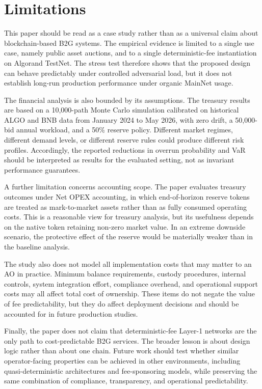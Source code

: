 \documentclass[runningheads]{llncs}
\begin{document}
\section{Limitations}

This paper should be read as a case study rather than as a universal claim about
blockchain-based B2G systems. The empirical evidence is limited to a single use
case, namely public asset auctions, and to a single deterministic-fee
instantiation on Algorand TestNet. The stress test therefore shows that the
proposed design can behave predictably under controlled adversarial load, but it
does not establish long-run production performance under organic MainNet usage.

The financial analysis is also bounded by its assumptions. The treasury results
are based on a 10{,}000-path Monte Carlo simulation calibrated on historical
ALGO and BNB data from January 2024 to May 2026, with zero drift, a
50{,}000-bid annual workload, and a 50\% reserve policy. Different market
regimes, different demand levels, or different reserve rules could produce
different risk profiles. Accordingly, the reported reductions in overrun
probability and VaR should be interpreted as results for the evaluated setting,
not as invariant performance guarantees.

A further limitation concerns accounting scope. The paper evaluates treasury
outcomes under Net OPEX accounting, in which end-of-horizon reserve tokens are
treated as mark-to-market assets rather than as fully consumed operating costs.
This is a reasonable view for treasury analysis, but its usefulness depends on
the native token retaining non-zero market value. In an extreme downside
scenario, the protective effect of the reserve would be materially weaker than in
the baseline analysis.

The study also does not model all implementation costs that may matter to an
AO in practice. Minimum balance requirements, custody procedures, internal
controls, system integration effort, compliance overhead, and operational support
costs may all affect total cost of ownership. These items do not negate the value
of fee predictability, but they do affect deployment decisions and should be
accounted for in future production studies.

Finally, the paper does not claim that deterministic-fee Layer-1 networks are the
only path to cost-predictable B2G services. The broader lesson is about design
logic rather than about one chain. Future work should test whether similar
operator-facing properties can be achieved in other environments, including
quasi-deterministic architectures and fee-sponsoring models, while preserving the
same combination of compliance, transparency, and operational predictability.
\end{document}
